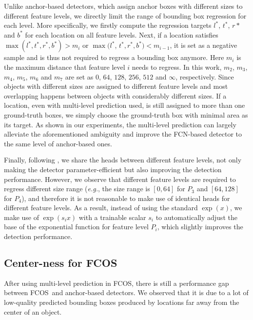 \documentclass[10pt,twocolumn,letterpaper]{article}
\newcommand{\1}{{\mathbbm{1}}}           %
\def\Ours{{FCNDet}\xspace}
\def\Ours{{FCOS}\xspace}
\def\eg{{\it e.g.}\xspace}
\begin{document}
Unlike anchor-based detectors, which assign anchor boxes with different sizes to different feature levels, we directly limit the range of bounding box regression for each level.
More specifically, we firstly compute the regression targets $l^*$, $t^*$, $r*$ and $b^*$ for each location on all feature levels. Next, if a location satisfies
$\max(l^*, t^*, r^*, b^*) > m_i$ or $\max(l^*$, $ t^*, r^*, b^*) < m_{i-1}$, it is set as a negative sample and is thus not required to regress a bounding box anymore.
%
%
Here $m_i$ is the maximum distance that feature level $i$ needs to regress.
In this work, $m_2$, $m_3$, $m_4$, $m_5$, $m_6$ and $m_7$ are set as $0$, $64$, $128$, $256$, $512$ and $\infty$, respectively. Since objects with different sizes are assigned to different feature levels and most overlapping happens between objects with %
considerably 
different sizes. If a location, even with multi-level prediction used, is still assigned to more than one ground-truth boxes, we simply choose the ground-truth box with minimal area as its target. As shown in our experiments, the multi-level prediction can %
largely alleviate 
the aforementioned ambiguity and improve the FCN-based detector to the same level of anchor-based ones.


Finally, following \cite{lin2017feature, lin2017focal}, we share the heads between different feature levels,  not only making  the detector parameter-efficient but also improving the detection performance. %
However, we observe that different feature levels are required to regress different size range (\eg, the size range is $[0, 64]$ for $P_3$ and $[64, 128]$ for $P_4$), and therefore it is not reasonable to make use of identical heads for different feature levels. As a result, instead of using the standard $\exp(x)$, we make use of $\exp(s_ix)$ with a trainable scalar $s_i$ to automatically adjust the base of the exponential function for feature level $P_i$, which slightly improves the detection performance.



\subsection{Center-ness for \Ours}
After using multi-level prediction in \Ours, there is still a performance gap between \Ours\ and anchor-based detectors. We observed that it is due to a lot of low-quality predicted bounding boxes produced by locations far away from the center of an object.
%
%
%
\end{document}
